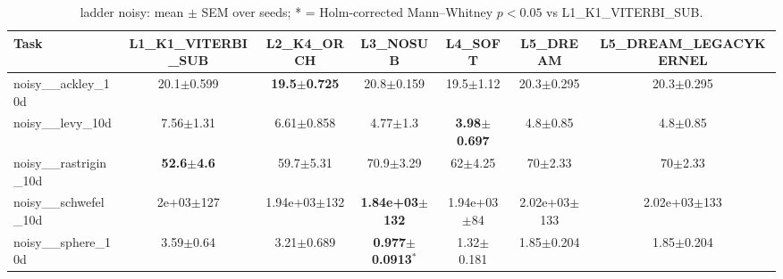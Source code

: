 \begin{table}[t]
\caption{ladder noisy: mean $\pm$ SEM over seeds; * = Holm-corrected Mann--Whitney $p<0.05$ vs L1_K1_VITERBI_SUB.}
\label{tab:ladder_noisy}
\begin{center}\small
\begin{tabular}{lcccccc}
\hline
Task & L1\_K1\_VITERBI\_SUB & L2\_K4\_ORCH & L3\_NOSUB & L4\_SOFT & L5\_DREAM & L5\_DREAM\_LEGACYKERNEL \\
\hline
noisy\_\_ackley\_10d & 20.1$\pm$0.599 & \textbf{19.5$\pm$0.725} & 20.8$\pm$0.159 & 19.5$\pm$1.12 & 20.3$\pm$0.295 & 20.3$\pm$0.295 \\
noisy\_\_levy\_10d & 7.56$\pm$1.31 & 6.61$\pm$0.858 & 4.77$\pm$1.3 & \textbf{3.98$\pm$0.697} & 4.8$\pm$0.85 & 4.8$\pm$0.85 \\
noisy\_\_rastrigin\_10d & \textbf{52.6$\pm$4.6} & 59.7$\pm$5.31 & 70.9$\pm$3.29 & 62$\pm$4.25 & 70$\pm$2.33 & 70$\pm$2.33 \\
noisy\_\_schwefel\_10d & 2e+03$\pm$127 & 1.94e+03$\pm$132 & \textbf{1.84e+03$\pm$132} & 1.94e+03$\pm$84 & 2.02e+03$\pm$133 & 2.02e+03$\pm$133 \\
noisy\_\_sphere\_10d & 3.59$\pm$0.64 & 3.21$\pm$0.689 & \textbf{0.977$\pm$0.0913}$^{*}$ & 1.32$\pm$0.181 & 1.85$\pm$0.204 & 1.85$\pm$0.204 \\
\hline
\end{tabular}
\end{center}
\end{table}